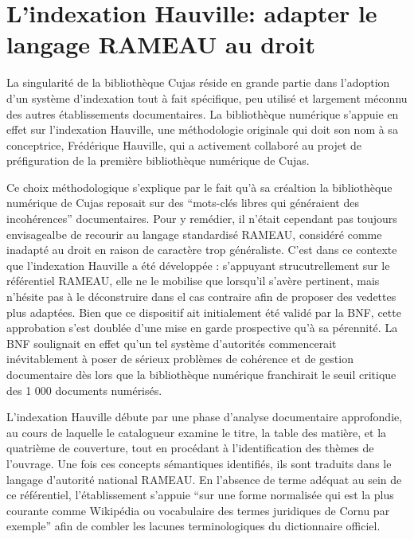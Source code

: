 \section[Hauville]{L’indexation Hauville: adapter le langage RAMEAU au droit}

La singularité de la bibliothèque Cujas réside en grande partie dans l'adoption d'un système d'indexation tout à fait spécifique, peu utilisé et largement méconnu des autres établissements documentaires. La bibliothèque numérique s'appuie en effet sur l'indexation Hauville, une méthodologie originale qui doit son nom à sa conceptrice, Frédérique Hauville, qui a activement collaboré au projet de préfiguration de la première bibliothèque numérique de Cujas. 

Ce choix méthodologique s'explique par le fait qu'à sa créaltion la bibliothèque numérique de Cujas reposait sur des \enquote{mots-clés libres qui généraient des incohérences} documentaires. Pour y remédier, il n'était cependant pas toujours envisagealbe de recourir au langage standardisé RAMEAU, considéré comme inadapté au droit en raison de caractère trop généraliste. C'est dans ce contexte que l'indexation Hauville a été développée : s'appuyant strucutrellement sur le référentiel RAMEAU, elle ne le mobilise que lorsqu'il s'avère pertinent, mais n'hésite pas à le déconstruire dans el cas contraire afin de proposer des vedettes plus adaptées. Bien que ce dispositif ait initialement été  validé par la BNF, cette approbation s'est doublée d'une mise en garde prospective qu'à sa pérennité. La BNF soulignait en effet qu'un tel système d'autorités commencerait inévitablement à poser de sérieux problèmes de cohérence et de gestion documentaire dès lors que la bibliothèque numérique franchirait le seuil critique des 1 000 documents numérisés.

L'indexation Hauville débute par une phase d'analyse documentaire approfondie, au cours de laquelle le catalogueur examine le titre, la table des matière, et la quatrième de couverture, tout en procédant à l'identification des thèmes de l'ouvrage. Une fois ces concepts sémantiques identifiés, ils sont traduits dans le langage d'autorité national RAMEAU. En l'absence de terme adéquat au sein de ce référentiel, l'établissement s'appuie \enquote{sur une forme normalisée qui est la plus courante comme Wikipédia ou vocabulaire des termes juridiques de Cornu par exemple} afin de combler les lacunes terminologiques du dictionnaire officiel. 

